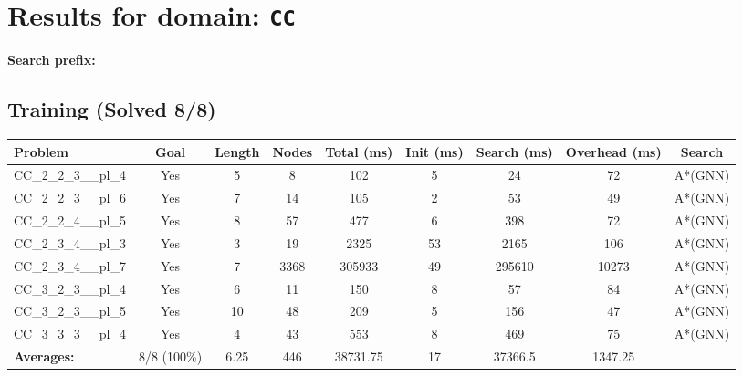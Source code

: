 \documentclass{article}
\begin{document}
\section*{Results for domain: \texttt{CC}}
\textbf{Search prefix:} 
\\[0.5cm]
\subsection*{Training (Solved 8/8)}
\begin{tabular}{lcccccccc}
\toprule
Problem & Goal & Length & Nodes & Total (ms) & Init (ms) & Search (ms) & Overhead (ms) & Search \\
\midrule
CC\_2\_2\_3\_\_pl\_4 & Yes & 5 & 8 & 102 & 5 & 24 & 72 & A*(GNN) \\
CC\_2\_2\_3\_\_pl\_6 & Yes & 7 & 14 & 105 & 2 & 53 & 49 & A*(GNN) \\
CC\_2\_2\_4\_\_pl\_5 & Yes & 8 & 57 & 477 & 6 & 398 & 72 & A*(GNN) \\
CC\_2\_3\_4\_\_pl\_3 & Yes & 3 & 19 & 2325 & 53 & 2165 & 106 & A*(GNN) \\
CC\_2\_3\_4\_\_pl\_7 & Yes & 7 & 3368 & 305933 & 49 & 295610 & 10273 & A*(GNN) \\
CC\_3\_2\_3\_\_pl\_4 & Yes & 6 & 11 & 150 & 8 & 57 & 84 & A*(GNN) \\
CC\_3\_2\_3\_\_pl\_5 & Yes & 10 & 48 & 209 & 5 & 156 & 47 & A*(GNN) \\
CC\_3\_3\_3\_\_pl\_4 & Yes & 4 & 43 & 553 & 8 & 469 & 75 & A*(GNN) \\
\textbf{Averages:} & 8/8 (100\%) & 6.25 & 446 & 38731.75 & 17 & 37366.5 & 1347.25 & \\
\bottomrule
\end{tabular}
\\[0.7cm]
\end{document}
